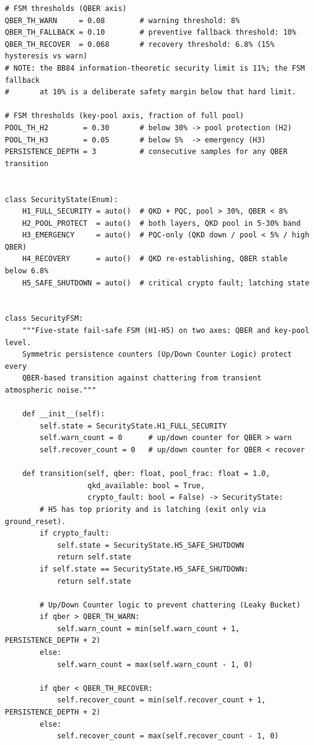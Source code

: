 \documentclass[a4paper,14pt]{extreport}
\begin{document}
\begin{latin}
\begin{verbatim}
# FSM thresholds (QBER axis)
QBER_TH_WARN     = 0.08        # warning threshold: 8%
QBER_TH_FALLBACK = 0.10        # preventive fallback threshold: 10%
QBER_TH_RECOVER  = 0.068       # recovery threshold: 6.8% (15% hysteresis vs warn)
# NOTE: the BB84 information-theoretic security limit is 11%; the FSM fallback
#       at 10% is a deliberate safety margin below that hard limit.

# FSM thresholds (key-pool axis, fraction of full pool)
POOL_TH_H2        = 0.30       # below 30% -> pool protection (H2)
POOL_TH_H3        = 0.05       # below 5%  -> emergency (H3)
PERSISTENCE_DEPTH = 3          # consecutive samples for any QBER transition


class SecurityState(Enum):
    H1_FULL_SECURITY = auto()  # QKD + PQC, pool > 30%, QBER < 8%
    H2_POOL_PROTECT  = auto()  # both layers, QKD pool in 5-30% band
    H3_EMERGENCY     = auto()  # PQC-only (QKD down / pool < 5% / high QBER)
    H4_RECOVERY      = auto()  # QKD re-establishing, QBER stable below 6.8%
    H5_SAFE_SHUTDOWN = auto()  # critical crypto fault; latching state


class SecurityFSM:
    """Five-state fail-safe FSM (H1-H5) on two axes: QBER and key-pool level.
    Symmetric persistence counters (Up/Down Counter Logic) protect every 
    QBER-based transition against chattering from transient atmospheric noise."""

    def __init__(self):
        self.state = SecurityState.H1_FULL_SECURITY
        self.warn_count = 0      # up/down counter for QBER > warn
        self.recover_count = 0   # up/down counter for QBER < recover

    def transition(self, qber: float, pool_frac: float = 1.0,
                   qkd_available: bool = True,
                   crypto_fault: bool = False) -> SecurityState:
        # H5 has top priority and is latching (exit only via ground_reset).
        if crypto_fault:
            self.state = SecurityState.H5_SAFE_SHUTDOWN
            return self.state
        if self.state == SecurityState.H5_SAFE_SHUTDOWN:
            return self.state

        # Up/Down Counter logic to prevent chattering (Leaky Bucket)
        if qber > QBER_TH_WARN:
            self.warn_count = min(self.warn_count + 1, PERSISTENCE_DEPTH + 2)
        else:
            self.warn_count = max(self.warn_count - 1, 0)
            
        if qber < QBER_TH_RECOVER:
            self.recover_count = min(self.recover_count + 1, PERSISTENCE_DEPTH + 2)
        else:
            self.recover_count = max(self.recover_count - 1, 0)


\end{verbatim}
\end{latin}
\end{document}

